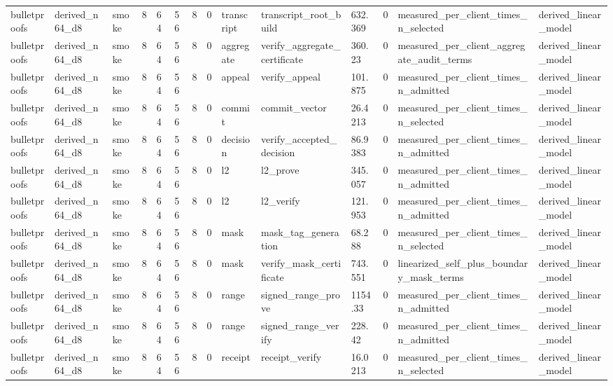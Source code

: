 \begin{table}[t]
\begin{tabular}{llllllllllllll}
bulletproofs & derived\_n64\_d8 & smoke & 8 & 64 & 56 & 8 & 0 & transcript & transcript\_root\_build & 632.369 & 0 & measured\_per\_client\_times\_n\_selected & derived\_linear\_model \\
bulletproofs & derived\_n64\_d8 & smoke & 8 & 64 & 56 & 8 & 0 & aggregate & verify\_aggregate\_certificate & 360.23 & 0 & measured\_per\_client\_aggregate\_audit\_terms & derived\_linear\_model \\
bulletproofs & derived\_n64\_d8 & smoke & 8 & 64 & 56 & 8 & 0 & appeal & verify\_appeal & 101.875 & 0 & measured\_per\_client\_times\_n\_admitted & derived\_linear\_model \\
bulletproofs & derived\_n64\_d8 & smoke & 8 & 64 & 56 & 8 & 0 & commit & commit\_vector & 26.4213 & 0 & measured\_per\_client\_times\_n\_selected & derived\_linear\_model \\
bulletproofs & derived\_n64\_d8 & smoke & 8 & 64 & 56 & 8 & 0 & decision & verify\_accepted\_decision & 86.9383 & 0 & measured\_per\_client\_times\_n\_admitted & derived\_linear\_model \\
bulletproofs & derived\_n64\_d8 & smoke & 8 & 64 & 56 & 8 & 0 & l2 & l2\_prove & 345.057 & 0 & measured\_per\_client\_times\_n\_admitted & derived\_linear\_model \\
bulletproofs & derived\_n64\_d8 & smoke & 8 & 64 & 56 & 8 & 0 & l2 & l2\_verify & 121.953 & 0 & measured\_per\_client\_times\_n\_admitted & derived\_linear\_model \\
bulletproofs & derived\_n64\_d8 & smoke & 8 & 64 & 56 & 8 & 0 & mask & mask\_tag\_generation & 68.288 & 0 & measured\_per\_client\_times\_n\_selected & derived\_linear\_model \\
bulletproofs & derived\_n64\_d8 & smoke & 8 & 64 & 56 & 8 & 0 & mask & verify\_mask\_certificate & 743.551 & 0 & linearized\_self\_plus\_boundary\_mask\_terms & derived\_linear\_model \\
bulletproofs & derived\_n64\_d8 & smoke & 8 & 64 & 56 & 8 & 0 & range & signed\_range\_prove & 1154.33 & 0 & measured\_per\_client\_times\_n\_admitted & derived\_linear\_model \\
bulletproofs & derived\_n64\_d8 & smoke & 8 & 64 & 56 & 8 & 0 & range & signed\_range\_verify & 228.42 & 0 & measured\_per\_client\_times\_n\_admitted & derived\_linear\_model \\
bulletproofs & derived\_n64\_d8 & smoke & 8 & 64 & 56 & 8 & 0 & receipt & receipt\_verify & 16.0213 & 0 & measured\_per\_client\_times\_n\_selected & derived\_linear\_model \\

\end{tabular}
\end{table}
